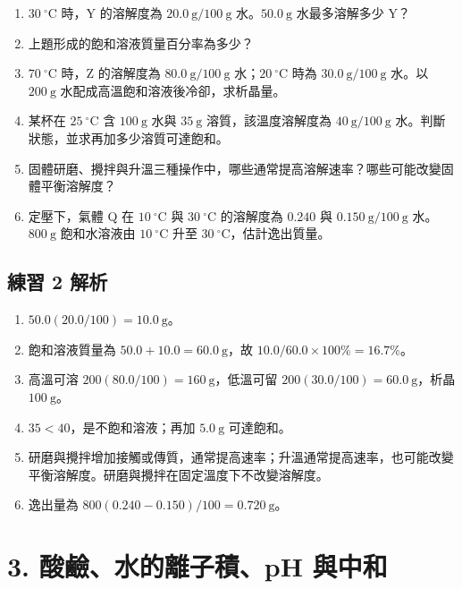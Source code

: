 \documentclass[11pt,a4paper]{article}
\providecommand{\tightlist}{%
  \setlength{\itemsep}{0pt}\setlength{\parskip}{0pt}}
\begin{document}
\begin{enumerate}
\def\labelenumi{\arabic{enumi}.}
\tightlist
\item
  \(30\ ^\circ\mathrm C\) 時，Y 的溶解度為 \(20.0\ \mathrm g/100\ \mathrm g\) 水。\(50.0\ \mathrm g\) 水最多溶解多少 Y？
\item
  上題形成的飽和溶液質量百分率為多少？
\item
  \(70\ ^\circ\mathrm C\) 時，Z 的溶解度為 \(80.0\ \mathrm g/100\ \mathrm g\) 水；\(20\ ^\circ\mathrm C\) 時為 \(30.0\ \mathrm g/100\ \mathrm g\) 水。以 \(200\ \mathrm g\) 水配成高溫飽和溶液後冷卻，求析晶量。
\item
  某杯在 \(25\ ^\circ\mathrm C\) 含 \(100\ \mathrm g\) 水與 \(35\ \mathrm g\) 溶質，該溫度溶解度為 \(40\ \mathrm g/100\ \mathrm g\) 水。判斷狀態，並求再加多少溶質可達飽和。
\item
  固體研磨、攪拌與升溫三種操作中，哪些通常提高溶解速率？哪些可能改變固體平衡溶解度？
\item
  定壓下，氣體 Q 在 \(10\ ^\circ\mathrm C\) 與 \(30\ ^\circ\mathrm C\) 的溶解度為 \(0.240\) 與 \(0.150\ \mathrm g/100\ \mathrm g\) 水。\(800\ \mathrm g\) 飽和水溶液由 \(10\ ^\circ\mathrm C\) 升至 \(30\ ^\circ\mathrm C\)，估計逸出質量。
\end{enumerate}

\subsection{練習 2 解析}\label{ux7df4ux7fd2-2-ux89e3ux6790}

\begin{enumerate}
\def\labelenumi{\arabic{enumi}.}
\tightlist
\item
  \(50.0(20.0/100)=10.0\ \mathrm g\)。
\item
  飽和溶液質量為 \(50.0+10.0=60.0\ \mathrm g\)，故 \(10.0/60.0\times100\%=16.7\%\)。
\item
  高溫可溶 \(200(80.0/100)=160\ \mathrm g\)，低溫可留 \(200(30.0/100)=60.0\ \mathrm g\)，析晶 \(100\ \mathrm g\)。
\item
  \(35<40\)，是不飽和溶液；再加 \(5.0\ \mathrm g\) 可達飽和。
\item
  研磨與攪拌增加接觸或傳質，通常提高速率；升溫通常提高速率，也可能改變平衡溶解度。研磨與攪拌在固定溫度下不改變溶解度。
\item
  逸出量為 \(800(0.240-0.150)/100=0.720\ \mathrm g\)。
\end{enumerate}

\section{3. 酸鹼、水的離子積、pH 與中和}\label{ux9178ux9e7cux6c34ux7684ux96e2ux5b50ux7a4dph-ux8207ux4e2dux548c}
\end{document}
